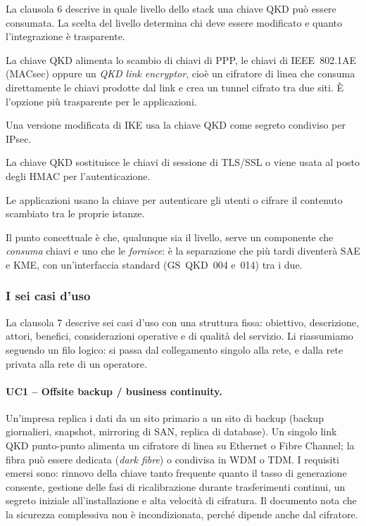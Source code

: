 La clausola 6 descrive in quale livello dello stack una chiave QKD può
essere consumata. La scelta del livello determina chi deve essere
modificato e quanto l'integrazione è trasparente.

\begin{description}[style=nextline,leftmargin=1.2em]
  \item[Livello di collegamento (L2)] La chiave QKD alimenta lo scambio di
        chiavi di PPP, le chiavi di IEEE~802.1AE (MACsec) oppure un
        \emph{QKD link encryptor}, cioè un cifratore di linea che consuma
        direttamente le chiavi prodotte dal link e crea un tunnel cifrato
        tra due siti. È l'opzione più trasparente per le applicazioni.
  \item[Livello di rete (L3)] Una versione modificata di IKE usa la chiave
        QKD come segreto condiviso per IPsec.
  \item[Livello di trasporto (L4)] La chiave QKD sostituisce le chiavi di
        sessione di TLS/SSL o viene usata al posto degli HMAC per
        l'autenticazione.
  \item[Livello applicativo] Le applicazioni usano la chiave per
        autenticare gli utenti o cifrare il contenuto scambiato tra le
        proprie istanze.
\end{description}

Il punto concettuale è che, qualunque sia il livello, serve un componente
che \emph{consuma} chiavi e uno che le \emph{fornisce}: è la separazione
che più tardi diventerà SAE e KME, con un'interfaccia standard
(GS~QKD~004 e~014) tra i due.

\subsubsection{I sei casi d'uso}

La clausola 7 descrive sei casi d'uso con una struttura fissa: obiettivo,
descrizione, attori, benefici, considerazioni operative e di qualità del
servizio. Li riassumiamo seguendo un filo logico: si passa dal
collegamento singolo alla rete, e dalla rete privata alla rete di un
operatore.

\paragraph{UC1 – Offsite backup / business continuity.}
Un'impresa replica i dati da un sito primario a un sito di backup
(backup giornalieri, snapshot, mirroring di SAN, replica di database). Un
singolo link QKD punto-punto alimenta un cifratore di linea su Ethernet o
Fibre Channel; la fibra può essere dedicata (\emph{dark fibre}) o condivisa
in WDM o TDM. I requisiti emersi sono: rinnovo della chiave tanto frequente
quanto il tasso di generazione consente, gestione delle fasi di
ricalibrazione durante trasferimenti continui, un segreto iniziale
all'installazione e alta velocità di cifratura. Il documento nota che la
sicurezza complessiva non è incondizionata, perché dipende anche dal
cifratore.

